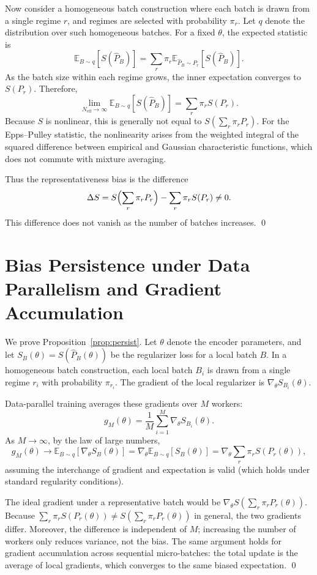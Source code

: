 \documentclass[10pt]{article}
\theoremstyle{remark}
\begin{document}
Now consider a homogeneous batch construction where each batch is drawn from a single regime $r$, and regimes are selected with probability $\pi_r$. Let $q$ denote the distribution over such homogeneous batches. For a fixed $\theta$, the expected statistic is
\[
\mathbb{E}_{B\sim q}[S(\hat{P}_B)] = \sum_r \pi_r \mathbb{E}_{\hat{P}_B \sim P_r}[S(\hat{P}_B)].
\]
As the batch size within each regime grows, the inner expectation converges to $S(P_r)$. Therefore,
\[
\lim_{N_{\mathrm{eff}}\to\infty} \mathbb{E}_{B\sim q}[S(\hat{P}_B)] = \sum_r \pi_r S(P_r).
\]
Because $S$ is nonlinear, this is generally not equal to $S(\sum_r \pi_r P_r)$. For the Epps--Pulley statistic, the nonlinearity arises from the weighted integral of the squared difference between empirical and Gaussian characteristic functions, which does not commute with mixture averaging.

Thus the representativeness bias is the difference
\[
\Delta S = S\Bigl(\sum_r \pi_r P_r\Bigr) - \sum_r \pi_r S(P_r) \neq 0.
\]
This difference does not vanish as the number of batches increases. \qed

\section{Bias Persistence under Data Parallelism and Gradient Accumulation}
\label{app:persist}

We prove Proposition~\ref{prop:persist}. Let $\theta$ denote the encoder parameters, and let $S_B(\theta) = S(\hat{P}_B(\theta))$ be the regularizer loss for a local batch $B$. In a homogeneous batch construction, each local batch $B_i$ is drawn from a single regime $r_i$ with probability $\pi_{r_i}$. The gradient of the local regularizer is $\nabla_\theta S_{B_i}(\theta)$.

Data-parallel training averages these gradients over $M$ workers:
\[
g_M(\theta) = \frac{1}{M}\sum_{i=1}^M \nabla_\theta S_{B_i}(\theta).
\]
As $M\to\infty$, by the law of large numbers,
\[
g_M(\theta) \to \mathbb{E}_{B\sim q}[\nabla_\theta S_B(\theta)] = \nabla_\theta \mathbb{E}_{B\sim q}[S_B(\theta)] = \nabla_\theta \sum_r \pi_r S(P_r(\theta)),
\]
assuming the interchange of gradient and expectation is valid (which holds under standard regularity conditions).

The ideal gradient under a representative batch would be $\nabla_\theta S(\sum_r \pi_r P_r(\theta))$. Because $\sum_r \pi_r S(P_r(\theta)) \neq S(\sum_r \pi_r P_r(\theta))$ in general, the two gradients differ. Moreover, the difference is independent of $M$; increasing the number of workers only reduces variance, not the bias. The same argument holds for gradient accumulation across sequential micro-batches: the total update is the average of local gradients, which converges to the same biased expectation. \qed
\end{document}
